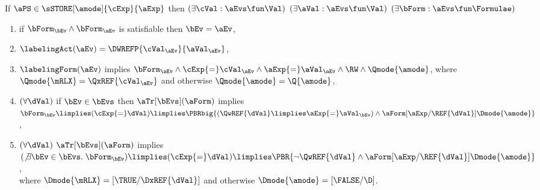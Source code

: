 \noindent
If $\aPS \in \sSTORE[\amode]{\cExp}{\aExp}$ then
$(\exists\cVal:\aEvs\fun\Val)$
$(\exists\aVal:\aEvs\fun\Val)$
$(\exists\bForm:\aEvs\fun\Formulae)$
\begin{enumerate}
\item if $\bForm_\bEv\land\bForm_\aEv$ is satisfiable then $\bEv=\aEv$,
\item $\labelingAct(\aEv) = \DWREFP{\cVal_\aEv}{\aVal_\aEv}$,
\item 
  $\labelingForm(\aEv)$ implies
  \begin{math}
    \bForm_\aEv
    \land \cExp{=}\cVal_\aEv
    \land \aExp{=}\aVal_\aEv
    \land \RW
    \land \Qmode{\amode}
  \end{math},
  where
  $\Qmode{\mRLX}=\QxREF{\cVal_\aEv}$ and otherwise $\Qmode{\amode}=\Q{\amode}$, %
\item
  \begin{math}
    (\forall\dVal)
  \end{math}
  if
  $\bEv\in\bEvs$
  then
  $\aTr[\bEvs](\aForm)$ implies 
  \begin{math}
    \bForm_\bEv
    \limplies (\cExp{=}\dVal)
    \limplies \PBRbig{
      (\QwREF{\dVal} \limplies \aExp{=}\aVal_\bEv)
      \land \aForm [\aExp/\REF{\dVal}]\Dmode{\amode}
    }
  \end{math},
\item %
  \begin{math}
    (\forall\dVal)
  \end{math}
  $\aTr[\bEvs](\aForm)$ implies 
  \begin{math}
    (\not\exists\bEv\in\bEvs.\; \bForm_\bEv)
    \limplies (\cExp{=}\dVal)
    \limplies \PBR{
      \lnot\QwREF{\dVal}
      \land \aForm [\aExp/\REF{\dVal}]\Dmode{\amode}
    }
  \end{math},
  \\ where 
  $\Dmode{\mRLX}=[\TRUE/\DxREF{\dVal}]$ and otherwise
  $\Dmode{\amode}=[\FALSE/\D]$. %
\end{enumerate}
